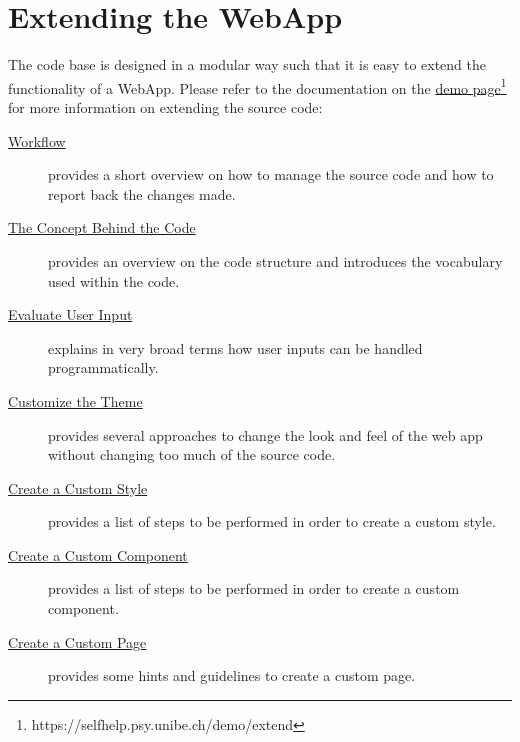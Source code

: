 \documentclass[a4paper,oneside]{book}
\begin{document}
\chapter{Extending the WebApp}\label{sec.extend}
The code base is designed in a modular way such that it is easy to extend the functionality of a WebApp.
Please refer to the documentation on the \href{https://selfhelp.psy.unibe.ch/demo/extend}{demo page}\footnote{https://selfhelp.psy.unibe.ch/demo/extend} for more information on extending the source code:

\begin{description}
    \item[\href{https://selfhelp.psy.unibe.ch/demo/extend/432}{Workflow}] provides a short overview on how to manage the source code and how to report back the changes made.
    \item[\href{https://selfhelp.psy.unibe.ch/demo/extend/416}{The Concept Behind the Code}] provides an overview on the code structure and introduces the vocabulary used within the code.
    \item[\href{https://selfhelp.psy.unibe.ch/demo/extend/417}{Evaluate User Input}] explains in very broad terms how user inputs can be handled programmatically.
    \item[\href{https://selfhelp.psy.unibe.ch/demo/extend/419}{Customize the Theme}] provides several approaches to change the look and feel of the web app without changing too much of the source code.
    \item[\href{https://selfhelp.psy.unibe.ch/demo/extend/418}{Create a Custom Style}] provides a list of steps to be performed in order to create a custom style.
    \item[\href{https://selfhelp.psy.unibe.ch/demo/extend/420}{Create a Custom Component}] provides a list of steps to be performed in order to create a custom component.
    \item[\href{https://selfhelp.psy.unibe.ch/demo/extend/421}{Create a Custom Page}] provides some hints and guidelines to create a custom page.
\end{description}
\end{document}
